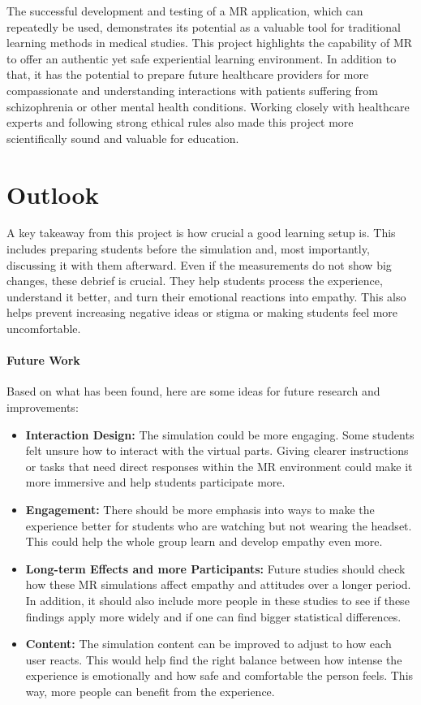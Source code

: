 The successful development and testing of a MR application, which can repeatedly be used, demonstrates its potential as a valuable tool for traditional learning methods in medical studies. This project highlights the capability of MR to offer an authentic yet safe experiential learning environment. In addition to that, it has the potential to prepare future healthcare providers for more compassionate and understanding interactions with patients suffering from schizophrenia or other mental health conditions. Working closely with healthcare experts and following strong ethical rules also made this project more scientifically sound and valuable for education.

\section{Outlook}

A key takeaway from this project is how crucial a good learning setup is. This includes preparing students before the simulation and, most importantly, discussing it with them afterward. Even if the measurements do not show big changes, these debrief is crucial. They help students process the experience, understand it better, and turn their emotional reactions into empathy. This also helps prevent increasing negative ideas or stigma or making students feel more uncomfortable.

\paragraph{Future Work}
Based on what has been found, here are some ideas for future research and improvements:

\begin{itemize}
    \item \textbf{Interaction Design:} The simulation could be more engaging. Some students felt unsure how to interact with the virtual parts. Giving clearer instructions or tasks that need direct responses within the MR environment could make it more immersive and help students participate more.
    \item \textbf{Engagement:} There should be more emphasis into ways to make the experience better for students who are watching but not wearing the headset. This could help the whole group learn and develop empathy even more.
    \item \textbf{Long-term Effects and more Participants:} Future studies should check how these MR simulations affect empathy and attitudes over a longer period. In addition, it should also include more people in these studies to see if these findings apply more widely and if one can find bigger statistical differences.
    \item \textbf{Content:} The simulation content can be improved to adjust to how each user reacts. This would help find the right balance between how intense the experience is emotionally and how safe and comfortable the person feels. This way, more people can benefit from the experience.
\end{itemize}

